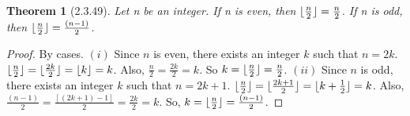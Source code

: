 \documentclass[a4paper, 12pt]{article}
\theoremstyle{plain}
\newtheorem*{theorem*}{Theorem}
\DeclarePairedDelimiter{\floor}{\lfloor}{\rfloor}
\begin{document}
	
	\begin{theorem*}[2.3.49]
		Let n be an integer. If n is even, then $\floor{\frac{n}{2}} = \frac{n}{2}$. \newline If 
		n is odd, then $\floor{\frac{n}{2}} = \frac{(n - 1)}{2}$.
	\end{theorem*}
	
	\begin{proof}
		By cases. \newline \newline $(i)$ Since $n$ is even,  there exists an integer $k$ such 
		that $n = 2k$. \newline $\floor{\frac{n}{2}} = \floor{\frac{2k}{2}} = \floor{k} = k$. 
		Also, $\frac{n}{2} = \frac{2k}{2} = k$. So $k = \floor{\frac{n}{2}} = \frac{n}{2}$.
		\newline
		\newline
		$(ii)$ Since $n$ is odd, there exists an integer $k$ such that $n = 2k + 1$. \newline 
		$\floor{\frac{n}{2}} = \floor{\frac{2k + 1}{2}} = \floor{k + \frac{1}{2}} = k$. Also, 
		$\frac{(n-1)}{2} = \frac{[(2k + 1) - 1]}{2} = \frac{2k}{2} = k$. \newline So, 
		$k = \floor{\frac{n}{2}} = \frac{(n - 1)}{2}$.
	\end{proof}
\end{document}
